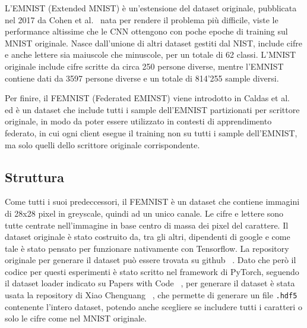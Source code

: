 L'EMNIST (Extended MNIST) è un'estensione del dataset originale,
pubblicata nel 2017 da Cohen et al.~\cite{cohen2017emnist} nata 
per rendere il problema più difficile, viste le performance altissime
che le CNN ottengono con poche epoche di training sul MNIST originale.
Nasce dall'unione di altri dataset gestiti dal NIST, include cifre e
anche lettere sia maiuscole che minuscole, per un totale di 62 classi.
L'MNIST originale include cifre scritte da circa 250 persone diverse,
mentre l'EMNIST contiene dati da 3597 persone diverse e un totale di 
814'255 sample diversi.

Per finire, il FEMNIST (Federated EMINST)
viene introdotto in Caldas et al.~\cite{caldas2019femnist}
ed è un dataset che include tutti i sample dell'EMNIST partizionati
per scrittore originale, in modo da poter essere utilizzato in contesti
di apprendimento federato, in cui ogni client esegue il training non su
tutti i sample dell'EMNIST, ma solo quelli dello scrittore originale
corrispondente.

\subsection{Struttura}
Come tutti i suoi predeccessori, il FEMNIST è un dataset che contiene
immagini di 28x28 pixel in greyscale, quindi ad un unico canale. Le
cifre e lettere sono tutte centrate nell'immagine in base centro di 
massa dei pixel del carattere.
Il dataset originale è stato costruito da, tra gli 
altri, dipendenti di google e come tale è stato pensato per funzionare
nativamente con Tensorflow. La repository originale per generare il
dataset può essere trovata su github ~\cite{leaf_repo}. Dato che però
il codice per questi esperimenti è stato scritto nel framework di PyTorch,
seguendo il dataset loader indicato su Papers with Code ~\cite{femnist_pwc},
per generare il dataset è stata usata la repository di Xiao Chenguang 
~\cite{femnist_hdf5}, che permette di generare un file \texttt{.hdf5} contenente
l'intero dataset, potendo anche scegliere se includere tutti i caratteri
o solo le cifre come nel MNIST originale. 


